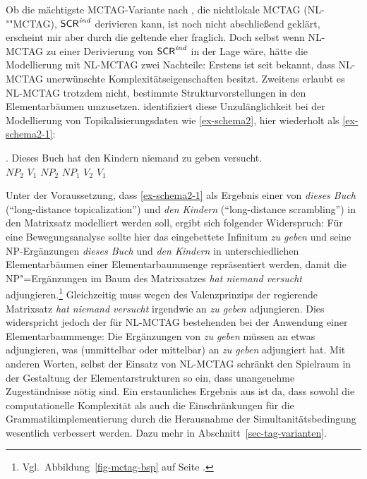 Ob die mächtigste MCTAG-Variante nach \cite{Weir:88}, die nichtlokale MCTAG (NL-""MCTAG), $\mathsf{SCR}^{\mathit{ind}}$ derivieren kann, ist noch nicht abschlie\ss end geklärt, erscheint mir aber durch die geltende  eher fraglich. Doch selbst wenn NL-MCTAG zu einer Derivierung von $\mathsf{SCR}^{\mathit{ind}}$ in der Lage wäre, hätte die Modellierung mit NL-MCTAG zwei Nachteile: Erstens ist seit \cite{Rambow:Satta:92} bekannt, dass NL-MCTAG unerwünschte Komplexitätseigenschaften besitzt. Zweitens erlaubt es NL-MCTAG trotzdem nicht, bestimmte Strukturvorstellungen in den Elementarbäumen umzusetzen. \citet[56f]{Rambow:94} identifiziert diese Unzulänglichkeit bei der Modellierung von Topikalisierungsdaten wie \ref{ex-schema2}, hier wiederholt als \ref{ex-schema2-1}:

\exg. {Dieses Buch} hat {den Kindern} niemand {zu geben} versucht.  \\
$\mathit{NP}_2$ $V_1$ $\mathit{NP}_2$ $\mathit{NP}_1$ $V_2$ $V_1$ \\
\citep[42]{Rambow:94} \label{ex-schema2-1}

Unter der Voraussetzung, dass \ref{ex-schema2-1} als Ergebnis einer  von {\it dieses Buch} ("`long-distance topicalization"') und {\it den Kindern} ("`long-distance scrambling"') in den Matrixsatz modelliert werden soll, ergibt sich folgender Widerspruch:
Für eine Bewegungsanalyse sollte hier das eingebettete Infinitum {\it zu geben} und seine NP-Ergänzungen {\it dieses Buch} und {\it den Kindern} in unterschiedlichen Elementarbäumen einer Elementarbaummenge repräsentiert werden, damit die NP"=Ergänzungen im Baum des Matrixsatzes {\it hat niemand versucht} adjungieren.\footnote{Vgl.\ Abbildung~\ref{fig-mctag-bsp} auf Seite \pageref{fig-mctag-bsp}.} Gleichzeitig muss wegen des Valenzprinzips der regierende Matrixsatz {\it hat niemand versucht} irgendwie an {\it zu geben} adjungieren. Dies widerspricht jedoch der für NL-MCTAG bestehenden  bei der Anwendung einer Elementarbaummenge: Die Ergänzungen von {\it zu geben} müssen an etwas adjungieren, was (unmittelbar oder mittelbar) an {\it zu geben} adjungiert hat. Mit anderen Worten, selbst der Einsatz von NL-MCTAG schränkt den Spielraum in der Gestaltung der Elementarstrukturen so ein, dass unangenehme Zugeständnisse nötig sind. Ein erstaunliches Ergebnis aus \cite{Rambow:94} ist da, dass sowohl die computationelle Komplexität als auch die Einschränkungen für die Grammatikimplementierung durch die Herausnahme der Simultanitätsbedingung wesentlich verbessert werden. Dazu mehr in Abschnitt~\ref{sec-tag-varianten}.


